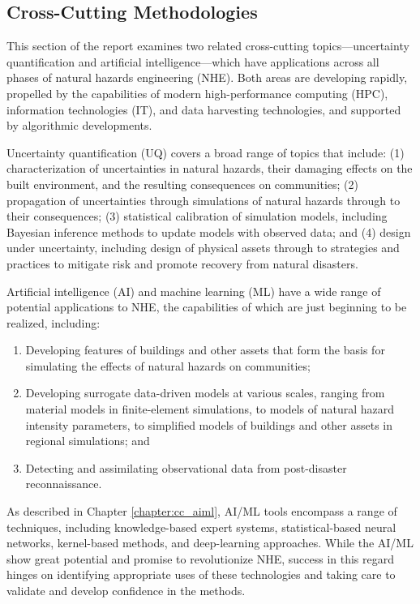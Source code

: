 
\begin{partbacktext}
\part{Cross-Cutting Methodologies}
\label{part:cross}

This section of the report examines two related cross-cutting topics---uncertainty quantification and artificial intelligence---which have applications across all phases of natural hazards engineering (NHE).  Both areas are developing rapidly, propelled by the capabilities of modern high-performance computing (HPC), information technologies (IT), and data harvesting technologies, and supported by algorithmic developments.  

Uncertainty quantification (UQ) covers a broad range of topics that include: (1) characterization of uncertainties in natural hazards, their damaging effects on the built environment, and the resulting consequences on communities; (2) propagation of uncertainties through simulations of natural hazards through to their consequences; (3) statistical calibration of simulation models, including Bayesian inference methods to update models with observed data; and (4) design under uncertainty, including design of physical assets through to strategies and practices to mitigate risk and promote recovery from natural disasters.  

Artificial intelligence (AI) and machine learning (ML) have a wide range of potential applications to NHE, the capabilities of which are just beginning to be realized, including:

\begin{enumerate}
    \item Developing features of buildings and other assets that form the basis for simulating the effects of natural hazards on communities;

    \item Developing surrogate data-driven models at various scales, ranging from material models in finite-element simulations, to models of natural hazard intensity parameters, to simplified models of buildings and other assets in regional simulations; and

    \item Detecting and assimilating observational data from post-disaster reconnaissance.
\end{enumerate}

As described in Chapter \ref{chapter:cc_aiml}, AI/ML tools encompass a range of techniques, including knowledge-based expert systems, statistical-based neural networks, kernel-based methods, and deep-learning approaches.
While the AI/ML show great potential and promise to revolutionize NHE, success in this regard hinges on identifying appropriate uses of these technologies and taking care to validate and develop confidence in the methods.


\end{partbacktext}
